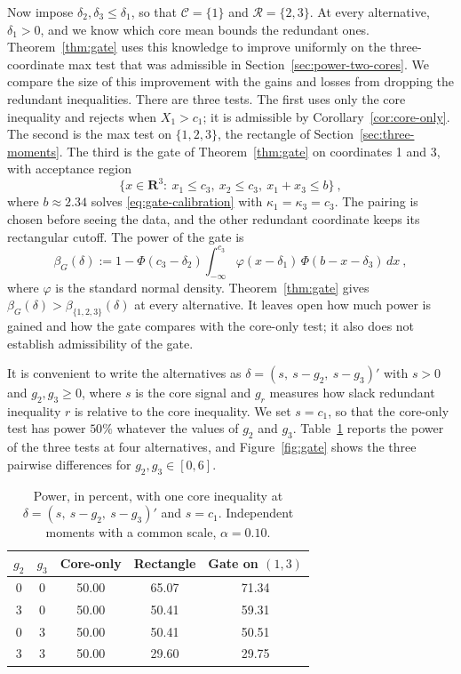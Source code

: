 \documentclass[11pt]{article}
\numberwithin{equation}{section}
\theoremstyle{definition}
\begin{document}
Now impose $\delta_2,\delta_3\le\delta_1$, so that $\mathcal C=\{1\}$ and $\mathcal R=\{2,3\}$. At every alternative, $\delta_1>0$, and we know which core mean bounds the redundant ones. Theorem~\ref{thm:gate} uses this knowledge to improve uniformly on the three-coordinate max test that was admissible in Section~\ref{sec:power-two-cores}. We compare the size of this improvement with the gains and losses from dropping the redundant inequalities. There are three tests. The first uses only the core inequality and rejects when $X_1>c_1$; it is admissible by Corollary~\ref{cor:core-only}. The second is the max test on $\{1,2,3\}$, the rectangle of Section~\ref{sec:three-moments}. The third is the gate of Theorem~\ref{thm:gate} on coordinates 1 and 3, with acceptance region
\[
\{x\in\mathbf R^3:\ x_1\le c_3,\ x_2\le c_3,\ x_1+x_3\le b\}~,
\]
where $b\approx2.34$ solves \eqref{eq:gate-calibration} with $\kappa_1=\kappa_3=c_3$. The pairing is chosen before seeing the data, and the other redundant coordinate keeps its rectangular cutoff. The power of the gate is
\begin{equation}\label{eq:gate-power}
\beta_G(\delta):=1-\Phi(c_3-\delta_2)\int_{-\infty}^{c_3}\varphi(x-\delta_1)\,\Phi(b-x-\delta_3)\,dx~,
\end{equation}
where $\varphi$ is the standard normal density. Theorem~\ref{thm:gate} gives $\beta_G(\delta)>\beta_{\{1,2,3\}}(\delta)$ at every alternative. It leaves open how much power is gained and how the gate compares with the core-only test; it also does not establish admissibility of the gate.

It is convenient to write the alternatives as $\delta=(s,\ s-g_2,\ s-g_3)'$ with $s>0$ and $g_2,g_3\ge0$, where $s$ is the core signal and $g_r$ measures how slack redundant inequality $r$ is relative to the core inequality. We set $s=c_1$, so that the core-only test has power $50\%$ whatever the values of $g_2$ and $g_3$. Table~\ref{tab:one-core} reports the power of the three tests at four alternatives, and Figure~\ref{fig:gate} shows the three pairwise differences for $g_2,g_3\in[0,6]$.

\begin{table}[!ht]
\centering
\begin{tabular}{ccccc}
\toprule
$g_2$ & $g_3$ & Core-only & Rectangle & Gate on $(1,3)$\\
\midrule
0 & 0 & 50.00 & 65.07 & 71.34\\
3 & 0 & 50.00 & 50.41 & 59.31\\
0 & 3 & 50.00 & 50.41 & 50.51\\
3 & 3 & 50.00 & 29.60 & 29.75\\
\bottomrule
\end{tabular}
\caption{Power, in percent, with one core inequality at $\delta=(s,\ s-g_2,\ s-g_3)'$ and $s=c_1$. Independent moments with a common scale, $\alpha=0.10$.}
\label{tab:one-core}
\end{table}
\end{document}
